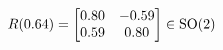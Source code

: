 \documentclass[preview]{standalone}
\begin{document}
\begin{align*}
\special{dvisvgm:raw <g id='unique000'>}R(0.64) = \begin{bmatrix} 0.80 & -0.59 \\ 0.59 & 0.80 \end{bmatrix} \in \text{SO}(2)\special{dvisvgm:raw </g>}
\end{align*}
\end{document}
